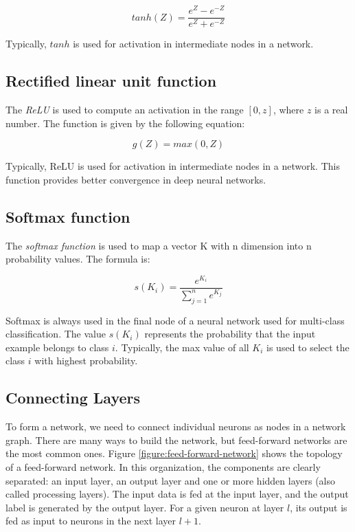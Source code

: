 \documentclass[12pt]{report}
\begin{document}
	\begin{equation}
		tanh(Z) = \frac{e^Z - e^{-Z}}{e^Z + e^{-Z}}
	\end{equation}
	
	Typically, $tanh$  is used for activation in intermediate nodes in a network.
	
	\subsection{Rectified linear unit function}
	The {\em \ac{ReLU}}  is used to compute an activation in the range $[0, z]$, where $z$ is a real number. 
	The function is given by the following equation:
	
	\begin{equation}
	g(Z) = max(0, Z)
	\end{equation}
	
	Typically, \ac{ReLU}  is used for activation in intermediate nodes in a network. This function provides better convergence in deep neural networks. 
	
	\subsection{Softmax function}
	The {\em softmax function} is used to map a vector K with n dimension into n probability values. The formula is:
	
	\begin{equation}
	s(K_i) = \frac{e^{K_i}}{\sum_{j=1}^{n}e^{K_j}}
	\end{equation}
	
	
	Softmax is always used in the final node of a neural network used for multi-class classification. The value $s(K_i)$ represents the probability that 
	the input example belongs to class $i$. Typically, the max value of all $K_i$ is used to select the class $i$ with highest probability. 
	
	\subsection {Connecting Layers}
	To form a network, we  need to connect individual neurons as nodes in a network graph. There are many ways to build the network, but feed-forward networks are the most common ones.  Figure \ref{figure:feed-forward-network}  shows the topology of a feed-forward network. In this organization, the components are clearly separated: an input layer, an output layer and one or more hidden layers (also called processing layers). The input data is fed at
	the input layer, and the output label is  generated by the output layer. For a given neuron at layer $l$, its output is fed as input to neurons in the next layer $l + 1$. 
	
\end{document}
